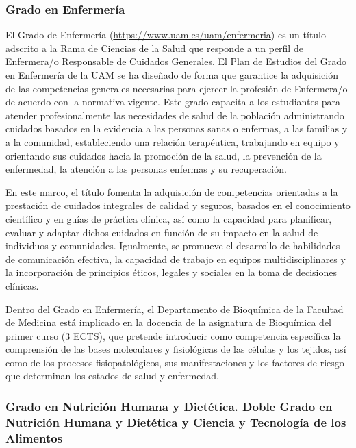 \documentclass[
  11pt,
  a4paper,
  twoside]{scrreprt}
\begin{document}
\subsubsection{Grado en Enfermería}\label{grado-en-enfermeruxeda}

El Grado de Enfermería (\url{https://www.uam.es/uam/enfermeria}) es un
título adscrito a la Rama de Ciencias de la Salud que responde a un
perfil de Enfermera/o Responsable de Cuidados Generales. El Plan de
Estudios del Grado en Enfermería de la UAM se ha diseñado de forma que
garantice la adquisición de las competencias generales necesarias para
ejercer la profesión de Enfermera/o de acuerdo con la normativa vigente.
Este grado capacita a los estudiantes para atender profesionalmente las
necesidades de salud de la población administrando cuidados basados en
la evidencia a las personas sanas o enfermas, a las familias y a la
comunidad, estableciendo una relación terapéutica, trabajando en equipo
y orientando sus cuidados hacia la promoción de la salud, la prevención
de la enfermedad, la atención a las personas enfermas y su recuperación.

En este marco, el título fomenta la adquisición de competencias
orientadas a la prestación de cuidados integrales de calidad y seguros,
basados en el conocimiento científico y en guías de práctica clínica,
así como la capacidad para planificar, evaluar y adaptar dichos cuidados
en función de su impacto en la salud de individuos y comunidades.
Igualmente, se promueve el desarrollo de habilidades de comunicación
efectiva, la capacidad de trabajo en equipos multidisciplinares y la
incorporación de principios éticos, legales y sociales en la toma de
decisiones clínicas.

Dentro del Grado en Enfermería, el Departamento de Bioquímica de la
Facultad de Medicina está implicado en la docencia de la asignatura de
Bioquímica del primer curso (3 ECTS), que pretende introducir como
competencia específica la comprensión de las bases moleculares y
fisiológicas de las células y los tejidos, así como de los procesos
fisiopatológicos, sus manifestaciones y los factores de riesgo que
determinan los estados de salud y enfermedad.

\subsubsection{Grado en Nutrición Humana y Dietética. Doble Grado en
Nutrición Humana y Dietética y Ciencia y Tecnología de los
Alimentos}\label{grado-en-nutriciuxf3n-humana-y-dietuxe9tica.-doble-grado-en-nutriciuxf3n-humana-y-dietuxe9tica-y-ciencia-y-tecnologuxeda-de-los-alimentos}
\end{document}

